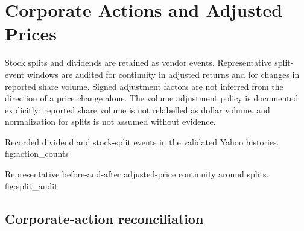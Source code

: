 \section{Corporate Actions and Adjusted Prices}

Stock splits and dividends are retained as vendor events. Representative
split-event windows are audited for continuity in adjusted returns and for
changes in reported share volume. Signed adjustment factors are not inferred
from the direction of a price change alone. The volume adjustment policy is
documented explicitly; reported share volume is not relabelled as dollar
volume, and normalization for splits is not assumed without evidence.



  {Recorded dividend and stock-split events in the validated Yahoo histories.}
  {fig:action_counts}



  {Representative before-and-after adjusted-price continuity around splits.}
  {fig:split_audit}

\subsection{Corporate-action reconciliation}

